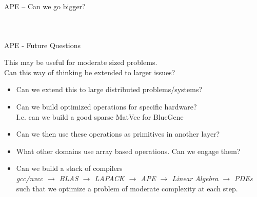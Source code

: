 \documentclass[9pt, compress, blue]{beamer}
\begin{document}
\begin{frame}{APE -- Can we go bigger?}
\begin{columns}
\begin{figure}
\end{figure}
\end{columns}
\end{frame}


\begin{frame}{APE - Future Questions}

This may be useful for moderate sized problems. \\
Can this way of thinking be extended to larger issues? 

\begin{itemize}
\item Can we extend this to large distributed problems/systems?
\item Can we build optimized operations for specific hardware? \\
I.e. can we build a good sparse MatVec for BlueGene
\item Can we then use these operations as primitives in another layer? 
\item What other domains use array based operations. Can we engage them?
\item Can we build a stack of compilers \\
\textit{gcc/nvcc $\rightarrow$ BLAS $\rightarrow$ LAPACK $\rightarrow$ APE $\rightarrow$ Linear Algebra $\rightarrow$ PDEs} \\
such that we optimize a problem of moderate complexity at each step. 
\end{itemize}
\end{frame}
\end{document}
